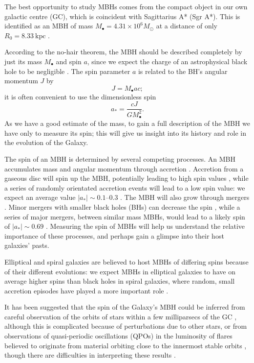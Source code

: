 \documentclass[useAMS,usedcolumn,usegraphicx,usenatbib]{mn2e}
\newcommand{\units}[1]{\ensuremath{~\mathrm{#1}}}
\begin{document}
The best opportunity to study MBHs comes from the compact object in our own galactic centre (GC), which is coincident with Sagittarius A* (Sgr A*). This is identified as an MBH of mass $M_\bullet = 4.31 \times 10^6 M_\odot$ at a distance of only $R_0 = 8.33\units{kpc}$ \citep{Gillessen2009}.

According to the no-hair theorem, the MBH should be described completely by just its mass $M_\bullet$ and spin $a$, since we expect the charge of an astrophysical black hole to be negligible \citep{Israel1967, Israel1968, Carter1971, Hawking1972, Robinson1975, Chandrasekhar1998}. The spin parameter $a$ is related to the BH's angular momentum $J$ by
\begin{equation}
J = M_\bullet ac;
\end{equation}
it is often convenient to use the dimensionless spin
\begin{equation}
a_\ast = \frac{cJ}{GM_\bullet^2}.
\end{equation}
As we have a good estimate of the mass, to gain a full description of the MBH we have only to measure its spin; this will give us insight into its history and role in the evolution of the Galaxy.

The spin of an MBH is determined by several competing processes. An MBH accumulates mass and angular momentum through accretion \citep{Volonteri2010}. Accretion from a gaseous disc will spin up the MBH, potentially leading to high spin values \citep{Volonteri2005}, while a series of randomly orientated accretion events will lead to a low spin value: we expect an average value $|a_\ast| \sim 0.1$--$0.3$ \citep*{King2006, King2008}. The MBH will also grow through mergers \citep{Yu2002, Malbon2007}. Minor mergers with smaller black holes (BHs) can decrease the spin \citep*{Hughes2003, Gammie2004}, while a series of major mergers, between similar mass MBHs, would lead to a likely spin of $|a_\ast| \sim 0.69$ \citep{Berti2008, Berti2007, Gonzalez2007}. Measuring the spin of MBHs will help us understand the relative importance of these processes, and perhaps gain a glimpse into their host galaxies' pasts.

Elliptical and spiral galaxies are believed to host MBHs of differing spins because of their different evolutions: we expect MBHs in elliptical galaxies to have on average higher spins than black holes in spiral galaxies, where random, small accretion episodes have played a more important role \citep*{Volonteri2007, Sikora2007}.

It has been suggested that the spin of the Galaxy's MBH could be inferred from careful observation of the orbits of stars within a few milliparsecs of the GC \citep{Merritt2010}, although this is complicated because of perturbations due to other stars, or from observations of quasi-periodic oscillations (QPOs) in the luminosity of flares believed to originate from material orbiting close to the innermost stable orbits \citep{Genzel2003a, Belanger2006, Trippe2007, Hamaus2009, Kato2010}, though there are difficulties in interpreting these results \citep{Psaltis2008a}.
\end{document}
